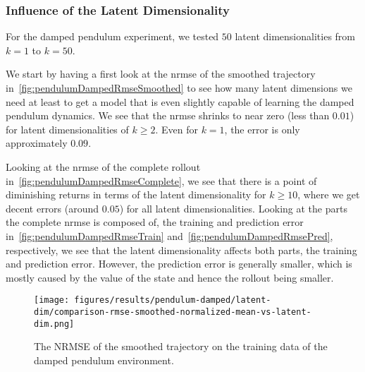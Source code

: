 		\subsubsection{Influence of the Latent Dimensionality}
			For the damped pendulum experiment, we tested \(50\) latent dimensionalities from \( k = 1 \) to \( k = 50 \).

			We start by having a first look at the \ac{nrmse} of the smoothed trajectory in~\autoref{fig:pendulumDampedRmseSmoothed} to see how many latent dimensions we need at least to get a model that is even slightly capable of learning the damped pendulum dynamics. We see that the \ac{nrmse} shrinks to near zero (less than \( 0.01 \)) for latent dimensionalities of \( k \geq 2 \). Even for \( k = 1 \), the error is only approximately \( 0.09 \).

			Looking at the \ac{nrmse} of the complete rollout in~\autoref{fig:pendulumDampedRmseComplete}, we see that there is a point of diminishing returns in terms of the latent dimensionality for \( k \geq 10 \), where we get decent errors (around \( 0.05 \)) for all latent dimensionalities. Looking at the parts the complete \ac{nrmse} is composed of, the training and prediction error in~\autoref{fig:pendulumDampedRmseTrain} and~\autoref{fig:pendulumDampedRmsePred}, respectively, we see that the latent dimensionality affects both parts, the training and prediction error. However, the prediction error is generally smaller, which is mostly caused by the value of the state and hence the rollout being smaller.

			\begin{figure}
				\centering
				\texttt{[image: figures/results/pendulum-damped/latent-dim/comparison-rmse-smoothed-normalized-mean-vs-latent-dim.png]}
				\caption[Error of the smoothed trajectory on the training data of the damped pendulum experiment]{The NRMSE of the smoothed trajectory on the training data of the damped pendulum environment.}
				\label{fig:pendulumDampedRmseSmoothed}
			\end{figure}

